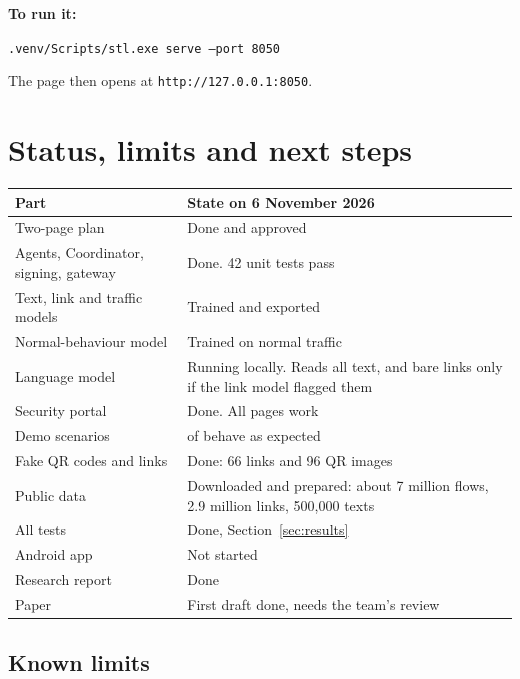 \documentclass[11pt,a4paper]{article}
\newcommand{\code}[1]{\texttt{#1}}
\newcommand{\need}[1][10]{\Needspace{#1\baselineskip}}
\begin{document}
\textbf{To run it:}

\begin{center}
\code{.venv/Scripts/stl.exe serve --port 8050}
\end{center}

The page then opens at \code{http://127.0.0.1:8050}.

\need[20]
\section{Status, limits and next steps}
\label{sec:status}

\begin{center}
\begin{tabularx}{\linewidth}{P{5.6cm}Y}
\toprule
\textbf{Part} & \textbf{State on 6 November 2026} \\
\midrule
Two-page plan & Done and approved \\
Agents, Coordinator, signing, gateway & Done. 42 unit tests pass \\
Text, link and traffic models & Trained and exported \\
Normal-behaviour model & Trained on normal traffic \\
Language model & Running locally. Reads all text, and bare links only if the link model flagged them \\
Security portal & Done. All pages work \\
Demo scenarios & \scenariosPassed{} of \scenariosTotal{} behave as expected \\
Fake QR codes and links & Done: 66 links and 96 QR images \\
Public data & Downloaded and prepared: about 7 million flows, 2.9 million links, 500,000 texts \\
All tests & Done, Section~\ref{sec:results} \\
Android app & Not started \\
Research report & Done \\
Paper & First draft done, needs the team's review \\
\bottomrule
\end{tabularx}
\end{center}

\subsection*{Known limits}
\end{document}
